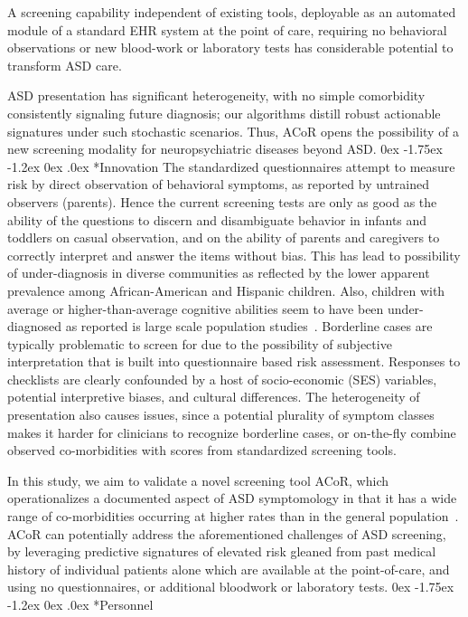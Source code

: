 \documentclass[onecolumn, compsoc,11pt]{IEEEtran}
\makeatletter
\renewcommand\subsection{\@startsection {subsection}{2}{\z@}%
                                   {0ex \@plus -1.75ex \@minus -1.2ex}%
                                   {0ex \@plus.0ex}%
                                   {\fontsize{11}{11}\selectfont\bfseries\sffamily\color{black}}}
\def\acor{ACoR\xspace}
\makeatother
\begin{document}
A  screening capability  independent of existing tools, deployable as an automated module  of a standard EHR system at the point of care, requiring no behavioral observations or  new blood-work or laboratory tests has considerable  potential to transform ASD care. 

ASD presentation has significant heterogeneity, with no simple comorbidity  consistently signaling future  diagnosis; our algorithms distill robust actionable signatures under such stochastic scenarios. Thus,  \acor opens the possibility of a new screening modality for  neuropsychiatric diseases beyond ASD.
\subsection*{Innovation}
The standardized questionnaires attempt to measure risk by direct observation of behavioral symptoms, as reported by untrained observers (parents). Hence the current screening  tests are only as good as the ability of the questions to discern and disambiguate behavior in infants and toddlers on casual observation, and on the ability of parents and caregivers to correctly interpret and answer the items without bias.
This has lead to possibility of  under-diagnosis in diverse communities as reflected by the
lower apparent prevalence among African-American and Hispanic children. Also, children with average or higher-than-average cognitive abilities seem to have been under-diagnosed as reported is large scale population studies~\cite{hyman2020identification}. Borderline cases are typically problematic to screen for due to the possibility  of subjective interpretation that is built into questionnaire based risk assessment. Responses to checklists are clearly confounded by a host of socio-economic (SES) variables, potential interpretive biases, and  cultural differences. The heterogeneity of presentation also causes issues, since a potential plurality of symptom classes makes it harder for clinicians  to recognize borderline cases, or on-the-fly combine observed co-morbidities with scores from  standardized screening tools. 

In this study, we aim to validate a novel screening tool \acor, which operationalizes a documented aspect of ASD symptomology in  that it has   a wide range  of co-morbidities occurring at  higher rates than in the general population~\cite{hyman2020identification}.
\acor  can potentially address the aforementioned   challenges of ASD screening, by leveraging predictive signatures of  elevated risk gleaned from past medical history of individual  patients alone which are available at the point-of-care, and using no questionnaires, or additional bloodwork or laboratory tests.
\subsection*{Personnel}

\clearpage
 
{\fontsize{9}{10}\selectfont


}
\end{document}
